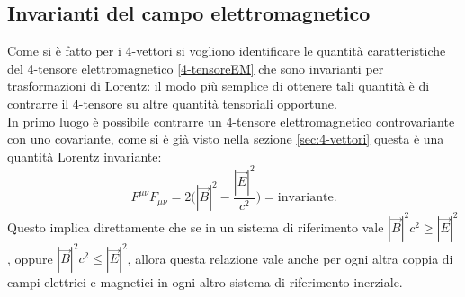 \subsection{Invarianti del campo elettromagnetico}
Come si è fatto per i 4-vettori si vogliono identificare le quantità caratteristiche del 4-tensore elettromagnetico \eqref{4-tensoreEM} che sono invarianti per trasformazioni di Lorentz: il modo più semplice di ottenere tali quantità è di contrarre il 4-tensore su altre quantità tensoriali opportune.\\

In primo luogo è possibile contrarre un 4-tensore elettromagnetico controvariante con uno covariante, come si è già visto nella sezione \ref{sec:4-vettori} questa è una quantità Lorentz invariante:
\begin{equation}
    F^{\mu\nu}F_{\mu\nu}=2\biggl(|\vec B|^2-\frac{|\vec E|^2}{c^2}\biggr)=\text{invariante}.
\end{equation}
Questo implica direttamente che se in un sistema di riferimento vale $|\vec B|^2c^2\geq|\vec E|^2$, oppure $|\vec B|^2c^2\leq|\vec E|^2$, allora questa relazione vale anche per ogni altra coppia di campi elettrici e magnetici in ogni altro sistema di riferimento inerziale.\\

